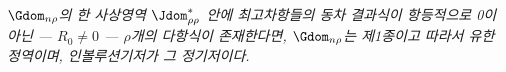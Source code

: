 
\emph{$\Gdom_{n\rho}$의 한 사상영역 $\Jdom^*_{\rho\rho}$ 안에 최고차항들의 동차 결과식이 항등적으로 0이 아닌 --- $R_0\ne0$ --- $\rho$개의 다항식이 존재한다면, $\Gdom_{n\rho}$는 제1종이고 따라서 유한 정역이며, 인볼루션기저가 그 정기저이다.}
